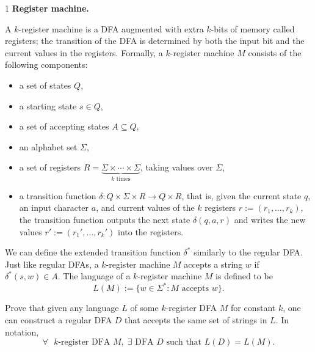 \documentclass[12pt]{article}
\begin{document}


\begin{problem}{1}
\textbf{Register machine.}

A $k$-register machine is a DFA augmented with extra $k$-bits of memory called registers; the transition of the DFA is determined by both the input bit and the current values in the registers. Formally, a $k$-register machine $M$ consists of the following components:
\begin{itemize}
    \item a set of states $Q$,
    \item a starting state $s \in Q$,
    \item a set of accepting states $A \subseteq Q$,
    \item an alphabet set $\Sigma$,
    \item a set of registers  $R = \underbrace{\Sigma \times \cdots \times \Sigma}_{k \text{ times}}$,
    taking values over $\Sigma$,
    \item a transition function 
    $\delta : Q \times \Sigma \times R \to Q \times R$,
    that is, given the current state $q$, an input character $a$, and current values of the $k$ registers $r := (r_1, \dots, r_k)$, the transition function outputs the next state $\delta(q,a,r)$ and writes the new values $r' := (r_1', \dots, r_k')$ into the registers.
\end{itemize}

We can define the extended transition function $\delta^*$ similarly to the regular DFA. Just like regular DFAs, a $k$-register machine $M$ accepts a string $w$ if $\delta^*(s, w) \in A$. The language of a $k$-register machine $M$ is defined to be
\[
L(M) := \{ w \in \Sigma^* : M \text{ accepts } w \}.
\]

Prove that given any language $L$ of some $k$-register DFA $M$ for constant $k$, one can construct a regular DFA $D$ that accepts the same set of strings in $L$. In notation,
\[
\forall \text{ $k$-register DFA } M, \; \exists \text{ DFA } D \text{ such that } L(D) = L(M).
\]
\end{problem}
\end{document}
